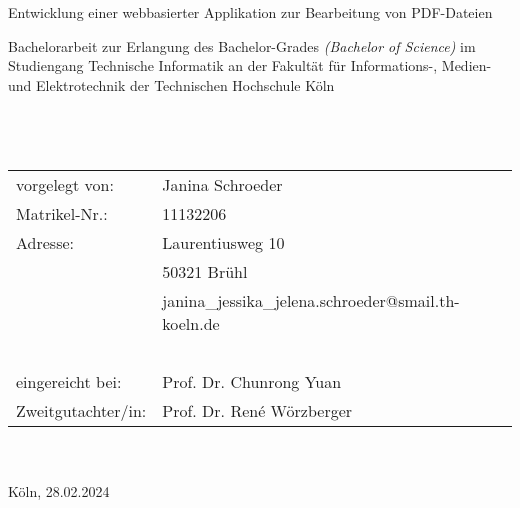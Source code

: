 \begin{titlepage}
	\begin{center}
	\end{center}

	\begin{huge}
		\noindent
		
		Entwicklung einer webbasierter Applikation zur \newline Bearbeitung von PDF-Dateien\\
	\end{huge}
	Bachelorarbeit zur Erlangung des Bachelor-Grades \newline
	\textit{(Bachelor of Science)} im Studiengang Technische Informatik \newline
	an der Fakultät für  Informations-, Medien- und Elektrotechnik \newline
	der Technischen Hochschule Köln \\
	~\\
	~\\
	~\\
	\noindent\begin{tabular}{ll}
		vorgelegt von: & Janina Schroeder \\
		Matrikel-Nr.: &	11132206 \\
		Adresse: & Laurentiusweg 10 \\
		~ &	50321 Brühl \\
		~ &	janina\_jessika\_jelena.schroeder@smail.th-koeln.de \\
		~ & ~ \\
		eingereicht bei: & Prof. Dr. Chunrong Yuan \\
		Zweitgutachter/in: & Prof. Dr. René Wörzberger
	\end{tabular}	
	~\\
	~\\
	Köln, 28.02.2024
\end{titlepage}